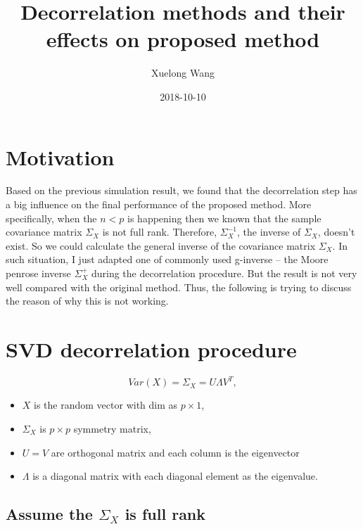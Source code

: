 \documentclass[]{article}
\title{Decorrelation methods and their effects on proposed method}
\author{Xuelong Wang}
\date{2018-10-10}
\providecommand{\tightlist}{%
  \setlength{\itemsep}{0pt}\setlength{\parskip}{0pt}}
\begin{document}
\maketitle

{
\setcounter{tocdepth}{2}
\tableofcontents
}
\section{Motivation}\label{motivation}

Based on the previous simulation result, we found that the decorrelation
step has a big influence on the final performance of the proposed
method. More specifically, when the \(n<p\) is happening then we known
that the sample covariance matrix \(\Sigma_{X}\) is not full rank.
Therefore, \(\Sigma^{-1}_X\), the inverse of \(\Sigma_{X}\), doesn't
exist. So we could calculate the general inverse of the covariance
matrix \(\Sigma_{X}\). In such situation, I just adapted one of commonly
used g-inverse -- the Moore penrose inverse \(\Sigma^{+}_X\) during the
decorrelation procedure. But the result is not very well compared with
the original method. Thus, the following is trying to discuss the reason
of why this is not working.

\section{SVD decorrelation procedure}\label{svd-decorrelation-procedure}

\[
  Var(X) = \Sigma_X = U\Lambda V^T,
\]

\begin{itemize}
\tightlist
\item
  \(X\) is the random vector with dim as \(p \times 1\),\\
\item
  \(\Sigma_X\) is \(p \times p\) symmetry matrix,\\
\item
  \(U = V\) are orthogonal matrix and each column is the eigenvector\\
\item
  \(\Lambda\) is a diagonal matrix with each diagonal element as the
  eigenvalue.
\end{itemize}

\subsection{\texorpdfstring{Assume the \(\Sigma_X\) is full
rank}{Assume the \textbackslash{}Sigma\_X is full rank}}\label{assume-the-sigma_x-is-full-rank}
\end{document}
